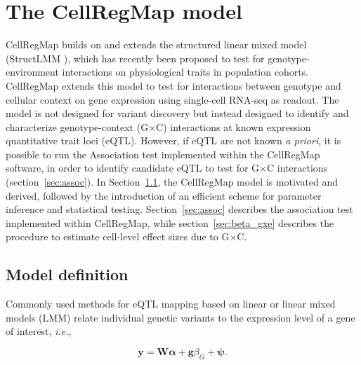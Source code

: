 \section{The CellRegMap model}\label{sec:CellRegMap} 

CellRegMap builds on and extends the structured linear mixed model (StructLMM \cite{moore2019linear}), which has recently been proposed to test for genotype-environment interactions on physiological traits in population cohorts. 
CellRegMap extends this model to test for interactions between genotype and cellular context on gene expression using single-cell RNA-seq as readout. 
The model is not designed for variant discovery but instead designed to identify and characterize genotype-context (G$\times$C) interactions at known expression quantitative trait loci (eQTL).
However, if eQTL are not known \textit{a priori}, it is possible to run the Association test implemented within the CellRegMap software, in order to identify candidate eQTL to test for G$\times$C interactions (section~\ref{sec:assoc}).
In Section~\ref{sec:model}, the CellRegMap model is motivated and derived, followed by the introduction of an efficient scheme for parameter inference and statistical testing.
Section~\ref{sec:assoc} describes the association test implemented within CellRegMap, while section~\ref{sec:beta_gxe} describes the procedure to estimate cell-level effect sizes due to G$\times$C.

\subsection{Model definition}
\label{sec:model}

Commonly used methods for eQTL mapping based on linear or linear mixed models (LMM) relate individual genetic variants to the expression level of a gene of interest, \textit{i.e.},

\begin{equation}\label{eq:LMM}
 \mathbf{y} =  \mathbf{W}\boldsymbol{\alpha} + \mathbf{g}\beta_G + \boldsymbol{\psi}. 
\end{equation}

